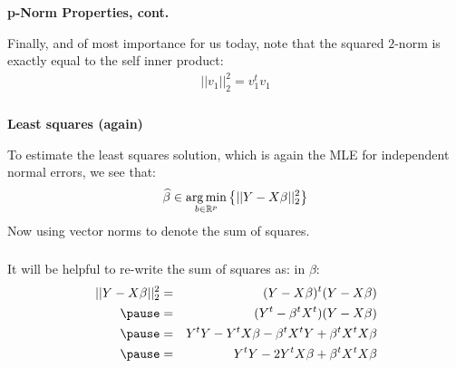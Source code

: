 \begin{frame}[fragile] \frametitle{}

{\bf p-Norm Properties, cont.}

Finally, and of most importance for us today, note that
the squared $2$-norm is exactly equal to the self inner
product:
\begin{align*}
|| v_1 ||_2^2 = v_1^t v_1
\end{align*}

\end{frame}

\begin{frame}[fragile] \frametitle{}

{\bf Least squares (again)}

To estimate the least squares solution, which is again the
MLE for independent normal errors, we see that:
\begin{align*}
\widehat{\beta} \in \mathop{\mathrm{arg\,min}}_{b \in \mathbb{R}^p} \left\{ ||Y - X \beta ||_2^2 \right\}
\end{align*}
\pause Now using vector norms to denote the sum of
squares.

\end{frame}

\begin{frame}[fragile] \frametitle{}

It will be helpful to re-write the sum of squares as:
in $\beta$:
\begin{eqnarray*}
||Y - X \beta ||_2^2 &=& (Y - X\beta)^t (Y - X\beta) \\ \pause
&=& (Y^t - \beta^t X^t) (Y - X\beta) \\ \pause
&=& Y^tY - Y^t X\beta - \beta^t X^t Y + \beta^t X^t X\beta \\ \pause
&=& Y^tY - 2 Y^t X\beta + \beta^t X^t X\beta
\end{eqnarray*}

\end{frame}

